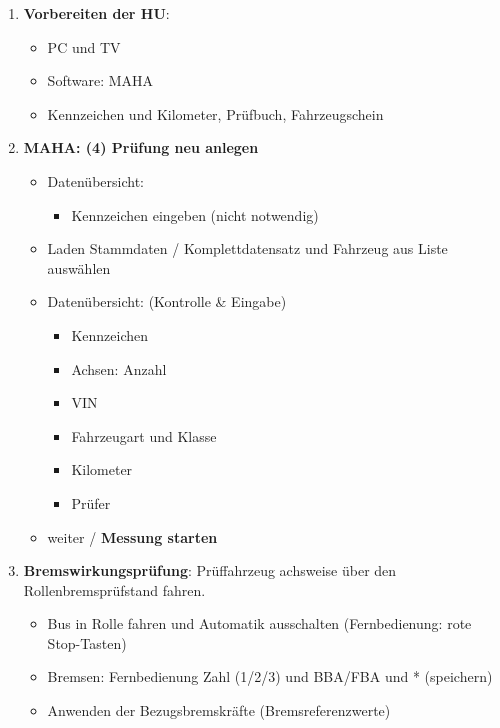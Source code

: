 \documentclass{vorlage-design-main}
\begin{document}
\begin{enumerate}
\def\labelenumi{\arabic{enumi}.}
\item
  \textbf{Vorbereiten der HU}:

  \begin{itemize}
  
  \item
    PC und TV
  \item
    Software: MAHA
  \item
    Kennzeichen und Kilometer, Prüfbuch, Fahrzeugschein
  \end{itemize}
\item
  \textbf{MAHA: (4) Prüfung neu anlegen}

  \begin{itemize}
  
  \item
    Datenübersicht:

    \begin{itemize}
    
    \item
      Kennzeichen eingeben (nicht notwendig)
    \end{itemize}
  \item
    Laden Stammdaten / Komplettdatensatz und Fahrzeug aus Liste
    auswählen
  \item
    Datenübersicht: (Kontrolle \& Eingabe)

    \begin{itemize}
    
    \item
      Kennzeichen
    \item
      Achsen: Anzahl
    \item
      VIN
    \item
      Fahrzeugart und Klasse
    \item
      Kilometer
    \item
      Prüfer
    \end{itemize}
  \item
    weiter / \textbf{Messung starten}
  \end{itemize}
\item
  \textbf{Bremswirkungsprüfung}: Prüffahrzeug achsweise über den
  Rollenbremsprüfstand fahren.

  \begin{itemize}
  
  \item
    Bus in Rolle fahren und Automatik ausschalten (Fernbedienung: rote
    Stop-Tasten)
  \item
    Bremsen: Fernbedienung Zahl (1/2/3) und BBA/FBA und * (speichern)
  \item
    Anwenden der Bezugsbremskräfte (Bremsreferenzwerte)


\end{itemize}
\end{enumerate}
\end{document}
